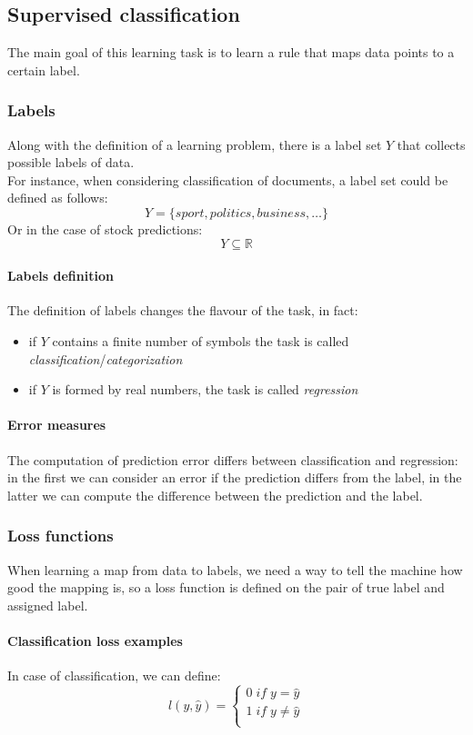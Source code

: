 \subsection{Supervised classification}

The main goal of this learning task is to learn a rule that maps data points
to a certain label.

\subsubsection{Labels}
Along with the definition of a learning problem, there is a label set $Y$ that collects
possible labels of data.\\
For instance, when considering classification of documents, a label set could be defined 
as follows: 
$$Y = \{\mathit{sport}, \mathit{politics}, \mathit{business}, \dots\}$$
Or in the case of stock predictions:
$$Y \subseteq \mathbb{R}$$

\paragraph{Labels definition}
The definition of labels changes the flavour of the task, in fact:
\begin{itemize}
    \item if $Y$ contains a finite number of symbols the task 
    is called \emph{classification}/\emph{categorization}
    \item if $Y$ is formed by real numbers, the task is called \emph{regression}
\end{itemize}

\paragraph{Error measures}
The computation of prediction error differs between classification and regression:
in the first we can consider an error if the prediction differs from the label, 
in the latter we can compute the difference between the prediction and the label.

\subsubsection{Loss functions}
When learning a map from data to labels, we need a way to tell the machine how good
the mapping is, so a loss function is defined on the pair of true label and assigned label.

\paragraph{Classification loss examples}
In case of classification, we can define:
\[
    l(y, \hat{y}) = \begin{cases}
        0\; \mathit{if}\; y = \hat{y}\\
        1\; \mathit{if}\; y \neq \hat{y}\\
\end{cases}\]

